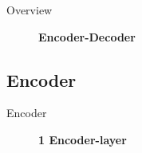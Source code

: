 \documentclass[10pt]{beamer}
\begin{document}
  \begin{frame}{Overview}
    \begin{figure}
      \centering
      \caption{\textbf{Encoder-Decoder} }
    \end{figure}
  \end{frame}

  \subsection{Encoder}

  \begin{frame}{Encoder}
    \begin{figure}
      \centering
      \caption{\textbf{1 Encoder-layer} }
      \label{fig:Encoder}
    \end{figure}
  \end{frame}
\end{document}
